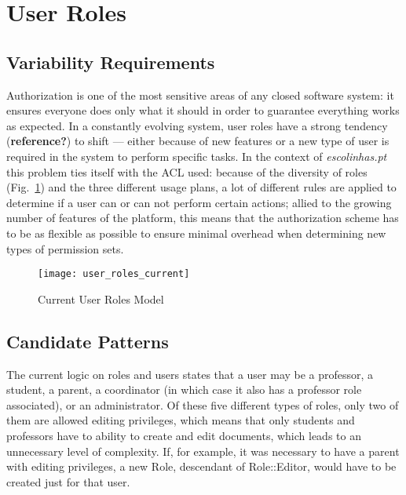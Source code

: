 \section{User Roles}\label{sec:fa_roles}

\subsection{Variability Requirements}\label{sec:fa_roles_variability_requirements}

Authorization is one of the most sensitive areas of any closed software system: it ensures everyone does only what it should in order to guarantee everything works as expected. In a constantly evolving system, user roles have a strong tendency (\textbf{reference?}) to shift --- either because of new features or a new type of user is required in the system to perform specific tasks. In the context of \emph{escolinhas.pt} this problem ties itself with the ACL used: because of the diversity of roles (Fig.~\ref{fig:user_roles_current}) and the three different usage plans, a lot of different rules are applied to determine if a user can or can not perform certain actions; allied to the growing number of features of the platform, this means that the authorization scheme has to be as flexible as possible to ensure minimal overhead when determining new types of permission sets.

\begin{figure}[H]
  \centering
  \texttt{[image: user\_roles\_current]}
  \caption{Current User Roles Model}
  \label{fig:user_roles_current}
\end{figure}

\subsection{Candidate Patterns}\label{sec:fa_roles_candidate_patterns}

The current logic on roles and users states that a user may be a professor, a student, a parent, a coordinator (in which case it also has a professor role associated), or an administrator. Of these five different types of roles, only two of them are allowed editing privileges, which means that only students and professors have to ability to create and edit documents, which leads to an unnecessary level of complexity. If, for example, it was necessary to have a parent with editing privileges, a new Role, descendant of Role::Editor, would have to be created just for that user.

